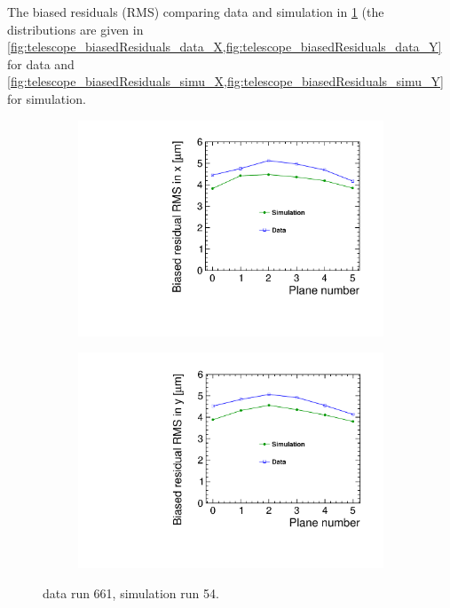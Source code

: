 The biased residuals (RMS) comparing data and simulation in
\cref{fig:telescopeBiasedRMS_data_simu} (the distributions are given
in
\cref{fig:telescope_biasedResiduals_data_X,fig:telescope_biasedResiduals_data_Y}
for data and
\cref{fig:telescope_biasedResiduals_simu_X,fig:telescope_biasedResiduals_simu_Y}
for simulation.
\begin{figure}[htbp] \centering
  \begin{subfigure}[b]{0.45\textwidth}
    \includegraphics[width=\textwidth]{figures/Telescope/biasedResiduals/RMSX_simu_vs_data.pdf}
    \caption{}
  \end{subfigure}\hfill
  \begin{subfigure}[b]{0.45\textwidth}
    \includegraphics[width=\textwidth]{figures/Telescope/biasedResiduals/RMSY_simu_vs_data.pdf}
    \caption{}
  \end{subfigure}
  \caption{data run 661, simulation run 54.}
  \label{fig:telescopeBiasedRMS_data_simu}
\end{figure}

